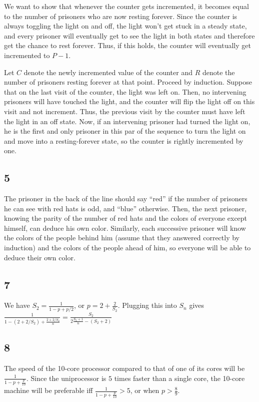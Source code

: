 \documentclass{article}
\begin{document}
We want to show that whenever the counter gets incremented, it becomes equal to the number of prisoners who are now resting forever. Since the counter is always toggling the light on and off, the light won't get stuck in a steady state, and every prisoner will eventually get to see the light in both states and therefore get the chance to rest forever. Thus, if this holds, the counter will eventually get incremented to $P-1$. 

Let $C$ denote the newly incremented value of the counter and $R$ denote the number of prisoners resting forever at that point. Proceed by induction. Suppose that on the last visit of the counter, the light was left on. Then, no intervening prisoners will have touched the light, and the counter will flip the light off on this visit and not increment. Thus, the previous visit by the counter must have left the light in an off state. Now, if an intervening prisoner had turned the light on, he is the first and only prisoner in this par of the sequence to turn the light on and move into a resting-forever state, so the counter is rightly incremented by one.
\subsection*{5}
The prisoner in the back of the line should say ``red'' if the number of prisoners he can see with red hats is odd, and ``blue'' otherwise. Then, the next prisoner, knowing the parity of the number of red hats and the colors of everyone except himself, can deduce his own color. Similarly, each successive prisoner will know the colors of the people behind him (assume that they answered correctly by induction) and the colors of the people ahead of him, so everyone will be able to deduce their own color.
\subsection*{7}
We have $S_2=\frac{1}{1-p+p/2}$, or $p=2+\frac{2}{S_2}$. Plugging this into $S_n$ gives $\frac{1}{1-(2+2/S_2)+\frac{2+2/S_2}{n}}=\frac{S_2}{2\frac{S_2+1}{n}-(S_2+2)}$
\subsection*{8}
The speed of the 10-core processor compared to that of one of its cores will be $\frac{1}{1-p+\frac{p}{10}}$. Since the uniprocessor is $5$ times faster than a single core, the 10-core machine will be preferable iff $\frac{1}{1-p+\frac{p}{10}}>5$, or when $p>\frac{8}{9}$.
\end{document}
